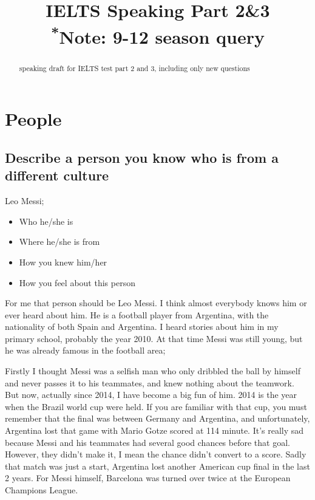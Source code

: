 \documentclass[conference]{IEEEtran}
\begin{document}
\title{IELTS Speaking Part 2\&3\\
{\footnotesize \textsuperscript{*}Note: 9-12 season query}}

\author{}

\maketitle

\begin{abstract}
speaking draft for IELTS test part 2 and 3, including only new questions
\end{abstract}

\section{People}
\subsection{Describe a person you know who is from a different culture}
Leo Messi;
    \begin{itemize}
        \item Who he/she is
        \item Where he/she is from
        \item How you knew him/her
        \item How you feel about this person
    \end{itemize}

For me that person should be Leo Messi. I think almost everybody knows him or ever heard about him.
He is a football player from Argentina, with the nationality of both Spain and Argentina.
I heard stories about him in my primary school, probably the year 2010.
At that time Messi was still young, but he was already famous in the football area;

Firstly I thought Messi was a selfish man who only dribbled the ball by himself and never passes it to his teammates,
and knew nothing about the teamwork. But now, actually since 2014, I have become a big fun of him.
2014 is the year when the Brazil world cup were held.
If you are familiar with that cup, you must remember that the final was between Germany and Argentina,
and unfortunately, Argentina lost that game with Mario Gotze scored at 114 minute.
It's really sad because Messi and his teammates had several good chances before that goal.
However, they didn't make it, I mean the chance didn't convert to a score.
Sadly that match was just a start, Argentina lost another American cup final in the last 2 years.
For Messi himself, Barcelona was turned over twice at the European Champions League.
\end{document}
